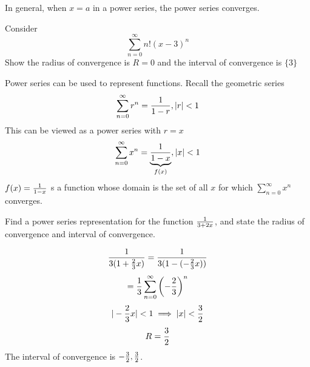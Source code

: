 \documentclass[english, 12pt]{article}
\begin{document}
\begin{rem}
In general, when $x=a$ in a power series, the power series converges.
\end{rem}
\begin{exercise}
Consider
\[\sum_{n=0}^\infty n! (x-3)^n\]
 Show the radius of convergence is $R=0$ and the interval of convergence is $\{3\}$
\end{exercise}
Power series can be used to represent functions. Recall the geometric series
\[\sum_{n=0}^\infty r^n = \frac{1}{1-r}, |r| < 1\]
This can be viewed as a power series with $r=x$
\[\sum_{n=0}^\infty x^n = \underbrace{\frac{1}{1-x}}_{f(x)}, |x| < 1\]
$f(x) = \frac{1}{1-x}$ s a function whose domain is the set of all $x$ for which $\sum_{n=0}^\infty x^n$ converges.
\begin{exmp}
Find a power series representation for the function $\frac{1}{3+2x}$, and state the radius of convergence and interval of convergence.
\begin{sol}
\[\frac{1}{3(1 + \frac{2}{3} x)} = \frac{1}{3(1 - (-\frac{2}{3} x))} \]
\[ = \frac{1}{3} \sum_{n=0}^\infty \left(-\frac{2}{3}\right)^n\]
\[ |-\frac{2}{3}x| < 1 \implies |x| < \frac{3}{2}\]
\[ R = \frac{3}{2}\]
The interval of convergence is $-\frac{3}{2}, \frac{3}{2}$.
\end{sol}
\end{exmp}
\end{document}
